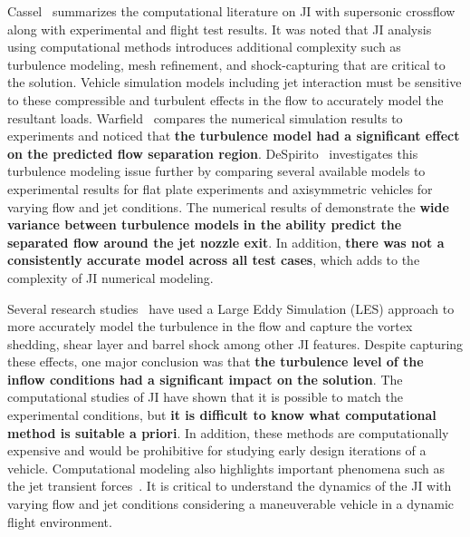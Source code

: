 \documentclass[12pt]{article}
\begin{document}
Cassel~\cite{cassel2003applying} summarizes the computational literature on JI with supersonic crossflow along with experimental and flight test results. It was noted that JI analysis using
computational methods introduces additional complexity such as turbulence modeling, mesh refinement, and shock-capturing that are critical to the solution. Vehicle simulation models including jet interaction must be sensitive to these compressible and turbulent effects in the flow to accurately model the resultant loads. Warfield~\cite{warfield1989calculation} compares the numerical simulation results to experiments and noticed that \textbf{the turbulence model had a significant effect on the predicted flow separation region}. DeSpirito~\cite{despirito2015turbulence,despirito2011factors} investigates this turbulence modeling issue further by comparing several available models to experimental results for flat plate experiments and axisymmetric vehicles for varying flow and jet conditions. The numerical results of demonstrate the \textbf{wide variance between turbulence models in the ability predict the separated flow around the jet nozzle exit}. In addition, \textbf{there was not a consistently accurate model across all test cases}, which adds to the complexity of JI numerical modeling.

Several research studies~\cite{ferrante2010inclined,ziefle2009large,kawai2010large} have used a Large Eddy Simulation (LES) approach to more accurately model the turbulence in the flow and capture the vortex shedding, shear layer and barrel shock among other JI features. Despite capturing these effects, one major conclusion was that \textbf{the turbulence level of the inflow conditions had a significant impact on the solution}. The computational studies of JI have shown that it is possible to match the experimental conditions, but \textbf{it is difficult to know what computational method is suitable a priori}. In addition, these methods are computationally expensive and would be prohibitive for studying early design iterations of a vehicle. Computational modeling also highlights important phenomena such as the jet transient  forces~\cite{Ebrahimi2000,Naumann1998,despirito2012transient}. It is critical to understand the dynamics of the JI with varying flow and jet conditions considering a maneuverable vehicle in a dynamic flight environment. 
\end{document}
